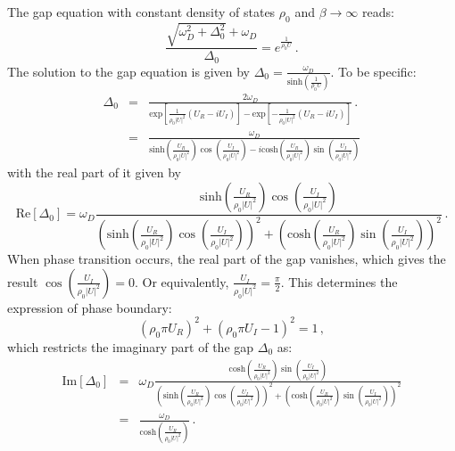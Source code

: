 \documentclass[aps,onecolumn,nofootinbib,superscriptaddress,notitlepage,longbibliography]{revtex4-1}
\begin{document}
The gap equation with constant density of states $\rho_{0}$ and $\beta\rightarrow\infty$
reads: 
\begin{equation}
\frac{\sqrt{\omega_{D}^{2}+\Delta_{0}^{2}}+\omega_{D}}{\Delta_{0}}=e^{\frac{1}{\rho_{0}U}}\,.
\end{equation}
The solution to the gap equation is given by $\Delta_{0}=\frac{\omega_{D}}{\text{sinh}\left(\frac{1}{\rho_{0}U}\right)}$.
To be specific: 
\begin{eqnarray}
\Delta_{0} & = & \frac{2\omega_{D}}{\text{exp}\left[\frac{1}{\rho_{0}|U|^{2}}\left(U_{R}-iU_{I}\right)\right]-\text{exp}\left[-\frac{1}{\rho_{0}|U|^{2}}\left(U_{R}-iU_{I}\right)\right]}\,.\nonumber \\
 & = & \frac{\omega_{D}}{\text{sinh}\left(\frac{U_{R}}{\rho_{0}|U|^{2}}\right)\cos\left(\frac{U_{I}}{\rho_{0}|U|^{2}}\right)-i\text{cosh}\left(\frac{U_{R}}{\rho_{0}|U|^{2}}\right)\sin\left(\frac{U_{I}}{\rho_{0}|U|^{2}}\right)}
\end{eqnarray}
with the real part of it given by 
\begin{equation}
\text{Re}[\Delta_{0}]=\omega_{D}\frac{\text{sinh}\left(\frac{U_{R}}{\rho_{0}|U|^{2}}\right)\cos\left(\frac{U_{I}}{\rho_{0}|U|^{2}}\right)}{\left(\text{sinh}\left(\frac{U_{R}}{\rho_{0}|U|^{2}}\right)\cos\left(\frac{U_{I}}{\rho_{0}|U|^{2}}\right)\right)^{2}+\left(\text{cosh}\left(\frac{U_{R}}{\rho_{0}|U|^{2}}\right)\sin\left(\frac{U_{I}}{\rho_{0}|U|^{2}}\right)\right)^{2}}\,.\label{RDelta_0}
\end{equation}
When phase transition occurs, the real part of the gap vanishes, which
gives the result $\cos\left(\frac{U_{I}}{\rho_{0}|U|^{2}}\right)=0$.
Or equivalently, $\frac{U_{I}}{\rho_{0}|U|^{2}}=\frac{\pi}{2}$. This
determines the expression of phase boundary: 
\begin{equation}
(\rho_{0}\pi U_{R})^{2}+(\rho_{0}\pi U_{I}-1)^{2}=1\,,\label{phase_transition}
\end{equation}
which restricts the imaginary part of the gap $\Delta_{0}$ as: 
\begin{eqnarray}
\text{Im}[\Delta_{0}] & = & \omega_{D}\frac{\text{cosh}\left(\frac{U_{R}}{\rho_{0}|U|^{2}}\right)\sin\left(\frac{U_{I}}{\rho_{0}|U|^{2}}\right)}{\left(\text{sinh}\left(\frac{U_{R}}{\rho_{0}|U|^{2}}\right)\cos\left(\frac{U_{I}}{\rho_{0}|U|^{2}}\right)\right)^{2}+\left(\text{cosh}\left(\frac{U_{R}}{\rho_{0}|U|^{2}}\right)\sin\left(\frac{U_{I}}{\rho_{0}|U|^{2}}\right)\right)^{2}}\nonumber \\
 & = & \frac{\omega_{D}}{\text{cosh}\left(\frac{U_{R}}{\rho_{0}|U|^{2}}\right)}\,.\label{IDelta_0}
\end{eqnarray}
\end{document}

